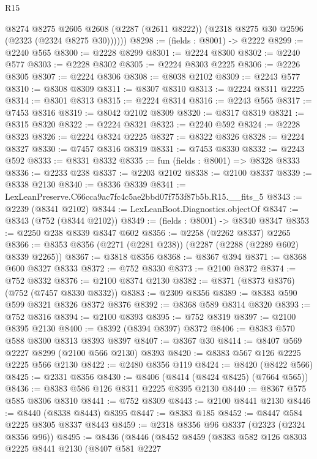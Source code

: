 \begin{lexlean}{R15}
\begin{coremodule}
        @8274
          @8275
          @2605
          @2608
          (@2287 (@2611 @8222))
          (@2318 @8275 @30 @2596 (@2323 (@2324 @8275 @30))))))
@8298 := (fields : @8001) -> @2222
@8299 := @2240 @565
@8300 := @2228 @8299
@8301 := @2224 @8300
@8302 := @2240 @577
@8303 := @2228 @8302
@8305 := @2224 @8303 @2225
@8306 := @2226 @8305
@8307 := @2224 @8306
@8308 := @8038 @2102
@8309 := @2243 @577
@8310 := @8308 @8309
@8311 := @8307 @8310
@8313 := @2224 @8311 @2225
@8314 := @8301 @8313
@8315 := @2224 @8314
@8316 := @2243 @565
@8317 := @7453 @8316
@8319 := @8042 @2102 @8309
@8320 := @8317 @8319
@8321 := @8315 @8320
@8322 := @2224 @8321
@8323 := @2240 @592
@8324 := @2228 @8323
@8326 := @2224 @8324 @2225
@8327 := @8322 @8326
@8328 := @2224 @8327
@8330 := @7457 @8316 @8319
@8331 := @7453 @8330
@8332 := @2243 @592
@8333 := @8331 @8332
@8335 := fun (fields : @8001) => @8328 @8333
@8336 := @2233 @238
@8337 := @2203 @2102
@8338 := @2100 @8337
@8339 := @8338 @2130
@8340 := @8336 @8339
@8341 := LexLeanPreserve.C66cca9ac7fc4c5ae2bbd07f753f87b5b.R15.__fits_5
@8343 := @2239 (@8341 @2102)
@8344 := LexLeanBoot.Diagnostics.objectOf
@8347 := @8343 (@752 (@8344 @2102))
@8349 := (fields : @8001) -> @8340 @8347
@8353 := @2250 @238 @8339 @8347 @602
@8356 := @2258 (@2262 @8337) @2265
@8366 := @8353 @8356 (@2271 (@2281 @238)) (@2287 (@2288 (@2289 @602) @8339 @2265))
@8367 := @3818 @8356
@8368 := @8367 @394
@8371 := @8368 @600 @8327 @8333
@8372 := @752 @8330
@8373 := @2100 @8372
@8374 := @752 @8332
@8376 := @2100 @8374 @2130
@8382 := @8371 (@8373 @8376) (@752 (@7457 @8330 @8332))
@8383 := @2309 @8356
@8389 := @8383 @590 @599 @8321 @8326 @8372 @8376
@8392 := @8368 @589 @8314 @8320
@8393 := @752 @8316
@8394 := @2100 @8393
@8395 := @752 @8319
@8397 := @2100 @8395 @2130
@8400 := @8392 (@8394 @8397) @8372
@8406 := @8383 @570 @588 @8300 @8313 @8393 @8397
@8407 := @8367 @30
@8414 := @8407 @569 @2227 @8299 (@2100 @566 @2130) @8393
@8420 := @8383 @567 @126 @2225 @2225 @566 @2130
@8422 := @2480 @8356 @119
@8424 := @8420 (@8422 @566)
@8425 := @2331 @8356
@8430 := @8406 (@8414 (@8424 @8425) (@7664 @565))
@8436 := @8383 @586 @126 @8311 @2225 @8395 @2130
@8440 := @8367 @575 @585 @8306 @8310
@8441 := @752 @8309
@8443 := @2100 @8441 @2130
@8446 := @8440 (@8338 @8443) @8395
@8447 := @8383 @185
@8452 := @8447 @584 @2225 @8305 @8337 @8443
@8459 := @2318 @8356 @96 @8337 (@2323 (@2324 @8356 @96))
@8495 := @8436
    (@8446
      (@8452
        @8459
        (@8383
          @582
          @126
          @8303
          @2225
          @8441
          @2130
          (@8407
            @581
            @2227

\end{coremodule}
\end{lexlean}
